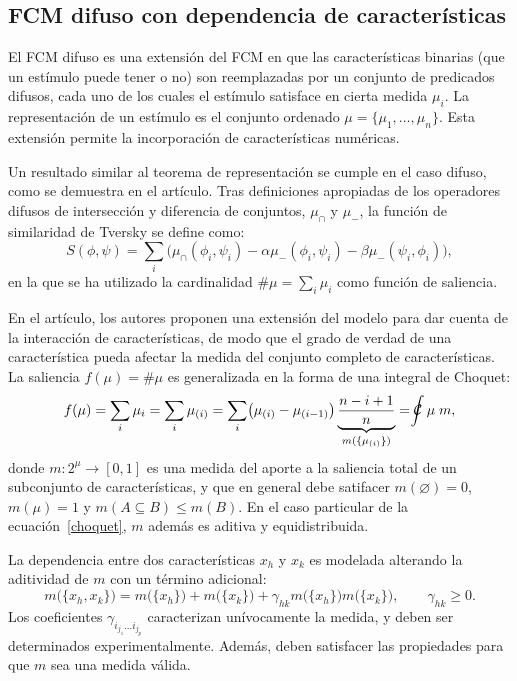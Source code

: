 \documentclass[spanish]{article}
\newcommand{\choquet}{\mathcal{C}\mspace{-18mu}\int}
\begin{document}
\subsection{FCM difuso con dependencia de características}
El FCM difuso es una extensión del FCM en que las características binarias (que un estímulo puede
tener o no) son reemplazadas por un conjunto de predicados difusos, cada uno de los cuales el
estímulo satisface en cierta medida $\mu_i$.  La representación de un estímulo es el conjunto
ordenado $\mu = \{\mu_1, \ldots, \mu_n\}$.  Esta extensión permite la incorporación de
características numéricas.

Un resultado similar al teorema de representación se cumple en el caso difuso, como se demuestra en
el artículo.  Tras definiciones apropiadas de los operadores difusos de intersección y diferencia de
conjuntos, $\mu_\cap$ y $\mu_-$, la función de similaridad de Tversky se define como:
\begin{equation}
    S(\phi, \psi) = \sum_i\bigl(\mu_\cap (\phi_i, \psi_i) -
                          \alpha\mu_-  (\phi_i, \psi_i)   -
                          \beta \mu_-  (\psi_i, \phi_i)\bigr),
\end{equation}
en la que se ha utilizado la cardinalidad $\#\mu = \sum_i\mu_i$ como función de saliencia.

En el artículo, los autores proponen una extensión del modelo para dar cuenta de la
interacción de características, de modo que el grado de verdad de una característica pueda afectar
la medida del conjunto completo de características.  La saliencia $f(\mu) = \#\mu$ es
generalizada en la forma de una integral de Choquet:
\begin{equation}\label{choquet}
    f(\mu) = \sum_i\mu_i = \sum_i\mu_{(i)}
           = \sum_i \bigl(\mu_{(i)} - \mu_{(i-1)}\bigr)
             \underbrace{\frac{n-i+1}{n}}_{m(\{\mu_{(i)}\})}
           = \choquet \mu\;m,
\end{equation}
donde $m: 2^\mu\to{}[0, 1]$ es una medida del aporte a la saliencia total de un subconjunto de
características, y que en general debe satifacer
$m(\varnothing)=0$,
$m(\mu)=1$ y
$m(A\subseteq B)\leq m(B)$.  En el caso particular de la ecuación~\ref{choquet}, $m$ además es aditiva y
equidistribuida.

La dependencia entre dos características $x_h$ y $x_k$ es modelada alterando la aditividad de $m$
con un término adicional:
\begin{equation}
    m\bigl(\{x_h, x_k\}\bigr) =
    m\bigl(\{x_h\}\bigr) +
    m\bigl(\{x_k\}\bigr) +
    \gamma_{hk} m\bigl(\{x_h\}\bigr) m\bigl(\{x_k\}\bigr),\qquad\gamma_{hk}\ge0.
\end{equation}
Los coeficientes $\gamma_{i_{j_1}\ldots i_{j_p}}$ caracterizan unívocamente la medida, 
y deben ser determinados experimentalmente.  Además, deben satisfacer las propiedades para que $m$
sea una medida válida.
\end{document}
